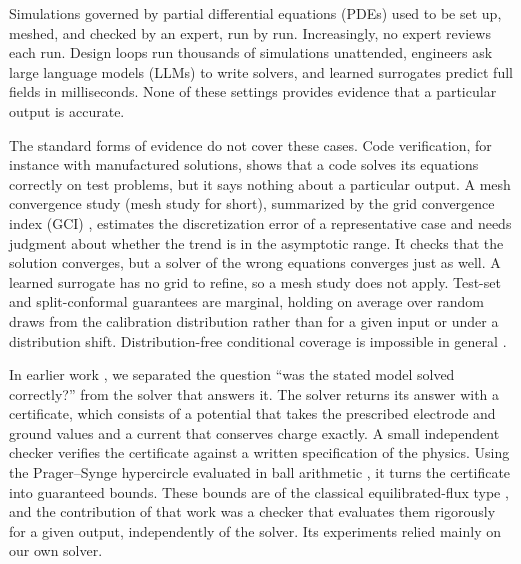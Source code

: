 \documentclass[11pt]{article}
\begin{document}
Simulations governed by partial differential equations (PDEs) used to be set up,
meshed, and checked by an expert, run by run. Increasingly, no expert reviews each run. Design
loops run thousands of simulations unattended, engineers ask large language models
(LLMs) to write solvers, and learned surrogates predict full fields in milliseconds.
None of these settings provides evidence that a particular output is accurate.

The standard forms of evidence do not cover these cases. Code verification, for instance
with manufactured solutions, shows that a code solves its equations correctly on
test problems, but it says nothing about a particular output. A mesh convergence
study (mesh study for short), summarized by the grid convergence index (GCI)
\cite{roache1998,celik2008}, estimates the discretization error of a representative
case and needs judgment about whether the trend is in the asymptotic range. It checks
that the solution converges, but a solver of the wrong equations converges just as
well. A learned surrogate has no grid to refine, so a mesh study does not apply. Test-set and split-conformal
guarantees \cite{angelopoulos2023} are marginal, holding on
average over random draws from the calibration distribution rather than for a given
input or under a distribution shift. Distribution-free conditional coverage is
impossible in general \cite{vovk2013,barber2021}.

In earlier work \cite{dovelos2026}, we separated the question ``was the stated model
solved correctly?'' from the solver that answers it. The solver returns its
answer with a certificate, which consists of a potential that takes the prescribed
electrode and ground values and a current that conserves charge exactly. A small
independent checker verifies the certificate against a written
specification of the physics. Using the Prager--Synge hypercircle
\cite{pragersynge1947} evaluated in ball arithmetic \cite{arb}, it turns the
certificate into guaranteed bounds. These bounds are of the classical
equilibrated-flux type \cite{ladeveze1983,braess2009,ernvohralik2015,repin2008}, and
the contribution of that work was a checker that evaluates them rigorously for a
given output, independently of the solver. Its experiments relied mainly on our own
solver.
\end{document}
